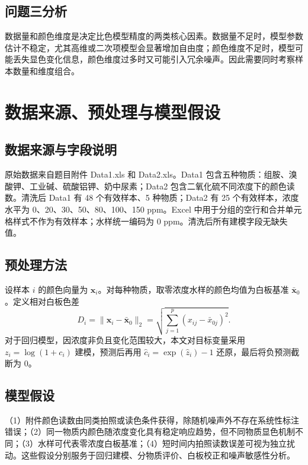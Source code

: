 \documentclass[UTF8,a4paper,12pt]{ctexart}
\begin{document}
\subsection{问题三分析}
数据量和颜色维度是决定比色模型精度的两类核心因素。数据量不足时，模型参数估计不稳定，尤其高维或二次项模型会显著增加自由度；颜色维度不足时，模型可能丢失显色变化信息，颜色维度过多时又可能引入冗余噪声。因此需要同时考察样本数量和维度组合。
\section{数据来源、预处理与模型假设}
\subsection{数据来源与字段说明}
原始数据来自题目附件 Data1.xls 和 Data2.xls。Data1 包含五种物质：组胺、溴酸钾、工业碱、硫酸铝钾、奶中尿素；Data2 包含二氧化硫不同浓度下的颜色读数。清洗后 Data1 有 48 个有效样本、5 种物质；Data2 有 25 个有效样本，浓度水平为 0、20、30、50、80、100、150 ppm。Excel 中用于分组的空行和合并单元格样式不作为有效样本；水样统一编码为 0 ppm。清洗后所有建模字段无缺失值。
\subsection{预处理方法}
设样本 $i$ 的颜色向量为 $\bm x_i$。对每种物质，取零浓度水样的颜色均值为白板基准 $\bar{\bm x}_0$。定义相对白板色差
\begin{equation}
D_i=\|\bm x_i-\bar{\bm x}_0\|_2=\sqrt{\sum_{j=1}^p(x_{ij}-\bar x_{0j})^2}.
\end{equation}
对于回归模型，因浓度非负且变化范围较大，本文对目标变量采用 $z_i=\log(1+c_i)$ 建模，预测后再用 $\hat c_i=\exp(\hat z_i)-1$ 还原，最后将负预测截断为 0。
\subsection{模型假设}
（1）附件颜色读数由同类拍照或读色条件获得，除随机噪声外不存在系统性标注错误；（2）同一物质内颜色随浓度变化具有稳定响应趋势，但不同物质显色机制不同；（3）水样可代表零浓度白板基准；（4）短时间内拍照读数误差可视为独立扰动。这些假设分别服务于回归建模、分物质评价、白板校正和噪声敏感性分析。
\end{document}
